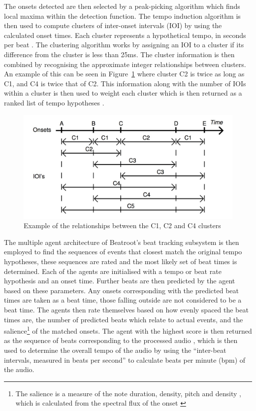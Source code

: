 \documentclass[a4paper, 11pt]{article}
\begin{document}
The onsets detected are then selected by a peak-picking algorithm which finds local maxima within the detection function. The tempo induction algorithm is then used to compute clusters of inter-onset intervals (IOI) by using the calculated onset times. Each cluster represents a hypothetical tempo, in seconds per beat \cite{dixon1}. The clustering algorithm works by assigning an IOI to a cluster if its difference from the cluster is less than 25ms. The cluster information is then combined by recognising the approximate integer relationships between clusters. An example of this can be seen in Figure~\ref{fig: br-clusters} where cluster C2 is twice as long as C1, and C4 is twice that of C2. This information along with the number of IOIs within a cluster is then used to weight each cluster which is then returned as a ranked list of tempo hypotheses \cite{dixon4}.

\begin{figure}[ht]
	\centering
	\includegraphics[scale=0.25]{br-clusters}
	\caption{Example of the relationships between the C1, C2 and C4 clusters \cite{dixon4}}
	\label{fig: br-clusters}
\end{figure}

The multiple agent architecture of Beatroot's beat tracking subsystem is then employed to find the sequences of events that closest match the original tempo hypotheses, these sequences are rated and the most likely set of beat times is determined. Each of the agents are initialised with a tempo or beat rate hypothesis and an onset time. Further beats are then predicted by the agent based on these parameters. Any onsets corresponding with the predicted beat times are taken as a beat time, those falling outside are not considered to be a beat time. The agents then rate themselves based on how evenly spaced the beat times are, the number of predicted beats which relate to actual events, and the salience\footnote{The salience is a measure of the note duration, density, pitch and density \cite{dixon1}, which is calculated from the spectral flux of the onset \cite{dixon4}} of the matched onsets. The agent with the highest score is then returned as the sequence of beats corresponding to the processed audio \cite{dixon4}, which is then used to determine the overall tempo of the audio by using the ``inter-beat intervals, measured in beats per second'' \cite{dixon1} to calculate beats per minute (bpm) of the audio.
\end{document}
